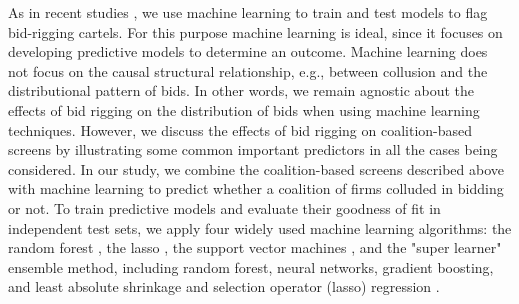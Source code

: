 \documentclass[a4paper,11pt]{article}
\begin{document}
	As in recent studies \citep[][]{foremny2018collusion,rabuzin2019prediction,garcia2020bidders,silveira2021won}, we use machine learning to train and test models to flag bid-rigging cartels. For this purpose machine learning is ideal, since it focuses on developing predictive models to determine an outcome. Machine learning does not focus on the causal structural relationship, e.g., between collusion and the distributional pattern of bids. In other words, we remain agnostic about the effects of bid rigging on the distribution of bids when using machine learning techniques. However, we discuss the effects of bid rigging on coalition-based screens by illustrating some common important predictors in all the cases being considered. In our study, we combine the coalition-based screens described above with machine learning to predict whether a coalition of firms colluded in bidding or not. To train predictive models and evaluate their goodness of fit in independent test sets, we apply four widely used machine learning algorithms: the random forest \citep[][]{Breiman2001}, the lasso \citep[][]{frank1993statistical,Tibshirani1996}, the support vector machines \citep[][]{cortes1995support}, and the "super learner" ensemble method, including random forest, neural networks, gradient boosting, and least absolute shrinkage and selection operator (lasso) regression \citep[][]{Laan2008}. 
	
\end{document}
